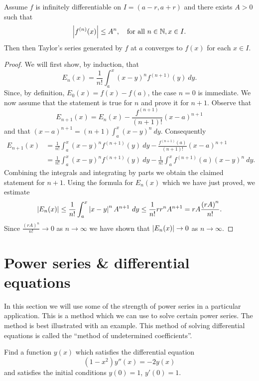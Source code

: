 \begin{theorem}
  Assume \(f\) is infinitely differentiable on \(I=(a-r,a+r)\) and there exists \(A>0\) such that
  \[
    \left|f^{(n)}(x)\right|\leq A^n, \quad \text{for all \(n\in \mathbb{N}, x\in I\)}.
  \]
  Then then Taylor's series generated by \(f\) at \(a\) converges to \(f(x)\) for each \(x\in I\).
\end{theorem}

\begin{proof}
  We will first show, by induction, that
  \[
    E_n(x) = \frac{1}{n!} \int_{a}^{x} {(x-y)}^n f^{(n+1)}(y) \ dy.
  \]
  Since, by definition, \(E_0(x) = f(x) - f(a) \), the case \(n=0\) is immediate.
  We now assume that the statement is true for \(n\) and prove it for \(n+1\).
  Observe that
  \[
    E_{n+1}(x) = E_{n}(x) -   \frac{f^{(n+1)}}{(n+1)!}{(x-a)}^{n+1}
  \]
  and that \({(x-a)}^{n+1} = (n+1) \int_{a}^{x}{(x-y)}^n \ dy\).
  Consequently
  \[
    \begin{aligned}
      E_{n+1}(x)
       & =
      \frac{1}{n!} \int_{a}^{x} {(x-y)}^n f^{(n+1)}(y) \ dy
      -   \frac{f^{(n+1)}(a)}{(n+1)!}{(x-a)}^{n+1} \\
       & =
      \frac{1}{n!} \int_{a}^{x} {(x-y)}^n f^{(n+1)}(y) \ dy
      - \frac{1}{n!}  \int_{a}^{x} f^{(n+1)}(a)  {(x-y)}^n \ dy.
    \end{aligned}
  \]
  Combining the integrals and integrating by parts we obtain the claimed statement for \(n+1\).
  Using the formula for \(E_n(x)\) which we have just proved, we estimate
  \[
    \left|E_n(x)\right|
    \leq \frac{1}{n!} \int_{a}^{x} \left|x-y\right|^n A^{n+1}  \ dy
    \leq \frac{1}{n!} r r^n  A^{n+1} = rA \frac{{(rA)}^n}{n!}.
  \]
  Since \(\frac{{(rA)}^n}{n!} \to 0\) as \(n\to \infty\) we have shown that \(\left|E_n(x)\right|  \to 0\) as \(n\to \infty\).
\end{proof}



\section{Power series \& differential equations}

In this section we will use some of the strength of power series in a particular application. This is a method which we can use to solve certain power series. The method is best illustrated with an example.
This method of solving differential equations is called the ``method of undetermined coefficients''.

\begin{task}
  Find a function \(y(x)\) which satisfies the differential equation
  \[
    (1-x^2)y''(x) = -2y(x)
  \]
  and satisfies the initial conditions \(y(0)=1\), \(y'(0)=1\).
\end{task}

